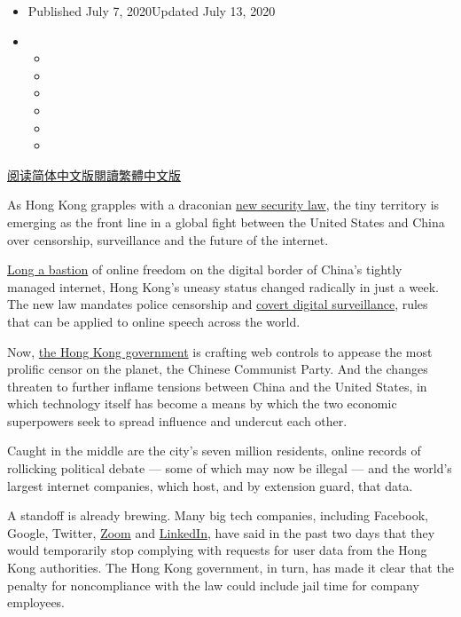 \begin{itemize}
\item
  Published July 7, 2020Updated July 13, 2020
\item
  \begin{itemize}
  \item
  \item
  \item
  \item
  \item
  \item
  \end{itemize}
\end{itemize}

\href{https://cn.nytimes.com/business/20200708/hong-kong-security-law-tech/}{阅读简体中文版}\href{https://cn.nytimes.com/business/20200708/hong-kong-security-law-tech/zh-hant/}{閱讀繁體中文版}

As Hong Kong grapples with a draconian
\href{https://www.nytimes.com/2020/07/13/world/asia/hong-kong-elections-security.html}{new
security law}, the tiny territory is emerging as the front line in a
global fight between the United States and China over censorship,
surveillance and the future of the internet.

\href{https://www.nytimes.com/2020/07/01/world/asia/hong-kong-security-law-china.html}{Long
a bastion} of online freedom on the digital border of China's tightly
managed internet, Hong Kong's uneasy status changed radically in just a
week. The new law mandates police censorship and
\href{https://www.nytimes.com/2020/07/02/world/asia/hong-kong-security-china.html}{covert
digital surveillance}, rules that can be applied to online speech across
the world.

Now,
\href{https://www.nytimes.com/2020/07/13/world/asia/hong-kong-elections-security.html}{the
Hong Kong government} is crafting web controls to appease the most
prolific censor on the planet, the Chinese Communist Party. And the
changes threaten to further inflame tensions between China and the
United States, in which technology itself has become a means by which
the two economic superpowers seek to spread influence and undercut each
other.

Caught in the middle are the city's seven million residents, online
records of rollicking political debate --- some of which may now be
illegal --- and the world's largest internet companies, which host, and
by extension guard, that data.

A standoff is already brewing. Many big tech companies, including
Facebook, Google, Twitter,
\href{https://hongkongfp.com/2020/07/07/breaking-zoom-suspends-data-requests-from-hong-kong-govt-over-national-security-law-concerns/}{Zoom}
and
\href{https://qz.com/1877636/chinas-great-firewall-arrives-in-hong-kongs-internet/}{LinkedIn},
have said in the past two days that they would temporarily stop
complying with requests for user data from the Hong Kong authorities.
The Hong Kong government, in turn, has made it clear that the penalty
for noncompliance with the law could include jail time for company
employees.

